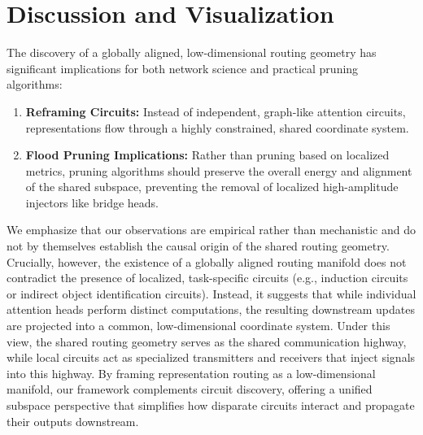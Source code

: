\documentclass[11pt,a4paper]{article}
\theoremstyle{definition}
\theoremstyle{plain}
\begin{document}
\section{Discussion and Visualization}
\label{sec:discussion}

The discovery of a globally aligned, low-dimensional routing geometry has significant implications for both network science and practical pruning algorithms:
\begin{enumerate}
    \item \textbf{Reframing Circuits:} Instead of independent, graph-like attention circuits, representations flow through a highly constrained, shared coordinate system.
    \item \textbf{Flood Pruning Implications:} Rather than pruning based on localized metrics, pruning algorithms should preserve the overall energy and alignment of the shared subspace, preventing the removal of localized high-amplitude injectors like bridge heads.
\end{enumerate}

We emphasize that our observations are empirical rather than mechanistic and do not by themselves establish the causal origin of the shared routing geometry. Crucially, however, the existence of a globally aligned routing manifold does not contradict the presence of localized, task-specific circuits (e.g., induction circuits or indirect object identification circuits). Instead, it suggests that while individual attention heads perform distinct computations, the resulting downstream updates are projected into a common, low-dimensional coordinate system. Under this view, the shared routing geometry serves as the shared communication highway, while local circuits act as specialized transmitters and receivers that inject signals into this highway. By framing representation routing as a low-dimensional manifold, our framework complements circuit discovery, offering a unified subspace perspective that simplifies how disparate circuits interact and propagate their outputs downstream.
\end{document}
